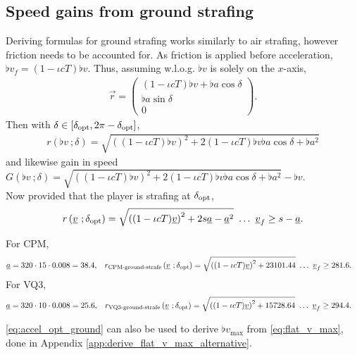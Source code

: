 \subsection{Speed gains from ground strafing}
\label{sec:accel_ground}
Deriving formulas for ground strafing works similarly to air strafing, however friction needs to be accounted for.
As friction is applied before acceleration, $\flat{v}_f = (1 - \iota cT)\flat{v}$. Thus, assuming w.l.o.g. $\flat{v}$ is solely on the $x$-axis,
\begin{align*}
\vec{r} =
\begin{pmatrix}
(1 - \iota cT)\flat{v} + \flat{a}\cos\delta\\\flat{a}\sin\delta\\0
\end{pmatrix}.
\end{align*}
Then with $\delta \in [\delta_{\operatorname{opt}}, 2\pi - \delta_{\operatorname{opt}}]$,
\begin{align*}
r\left(\flat{v}\ ;\delta \right) = \sqrt{\left((1 - \iota cT)\flat{v} \right)^2 + 2(1 - \iota cT)\flat{v}\flat{a}\cos\delta + \flat{a}^2}
\end{align*}
and likewise gain in speed $G\left(\flat{v}\ ;\delta \right) = \sqrt{\left((1 - \iota cT)\flat{v} \right)^2 + 2(1 - \iota cT)\flat{v}\flat{a}\cos\delta + \flat{a}^2} - \flat{v}$.\\

Now provided that the player is strafing at $\delta_{\operatorname{opt}}$,
\begin{align}
\label{eq:accel_opt_ground}
r\left(\flat{v}\ ;\delta_{\opt} \right) = \sqrt{\left((1 - \iota cT)\flat{v} \right)^2 + 2s\flat{a} - \flat{a}^2}\ \ldots\ \flat{v}_f\ge s - \flat{a}.
\end{align}

For CPM,
\begin{align*}
\flat{a} = 320\cdot 15\cdot 0.008 = 38.4, && r_{\text{CPM-ground-strafe}}\left(\flat{v}\ ;\delta_{\opt} \right) &= \sqrt{\left((1 - \iota cT)\flat{v} \right)^2 + 23101.44}\ \ldots\ \flat{v}_f\ge 281.6.
\end{align*}
For VQ3,
\begin{align*}
\flat{a} = 320\cdot 10\cdot 0.008 = 25.6, && r_{\text{VQ3-ground-strafe}}\left(\flat{v}\ ;\delta_{\opt} \right) &= \sqrt{\left((1 - \iota cT)\flat{v} \right)^2 + 15728.64}\ \ldots\ \flat{v}_f\ge 294.4.
\end{align*}

\eqref{eq:accel_opt_ground} can also be used to derive $\flat{v}_{\max}$ from \eqref{eq:flat_v_max}, done in Appendix \ref{app:derive_flat_v_max_alternative}.


